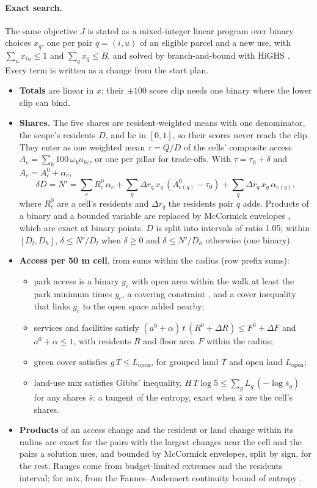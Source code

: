 \documentclass[10pt]{article}
\begin{document}
\paragraph{Exact search.} The same objective $J$ is stated as a mixed-integer linear program over binary choices
$x_q$, one per pair $q = (i, u)$ of an eligible parcel and a new use, with $\sum_u x_{iu} \le 1$ and
$\sum_q x_q \le B$, and solved by branch-and-bound with HiGHS \citep{huangfu2018}. Every term is written as a change
from the start plan.
\begin{itemize}
\item \textbf{Totals} are linear in $x$; their $\pm 100$ score clip needs one binary where the lower clip can bind.
\item \textbf{Shares.} The five shares are resident-weighted means with one denominator, the scope's residents $D$,
and lie in $[0, 1]$, so their scores never reach the clip. They enter as one weighted mean $\tau = Q/D$ of the cells'
composite access $A_c = \sum_k 100\,\omega_k a_{kc}$, or one per pillar for trade-offs. With $\tau = \tau_0 + \delta$
and $A_c = A^0_c + \alpha_c$,
\begin{equation}
\delta D = N' = \sum_c R^0_c\,\alpha_c + \sum_q \Delta r_q\, x_q\,(A^0_{c(q)} - \tau_0) + \sum_q \Delta r_q\, x_q\, \alpha_{c(q)},
\end{equation}
where $R^0_c$ are a cell's residents and $\Delta r_q$ the residents pair $q$ adds. Products of a binary and a
bounded variable are replaced by McCormick envelopes \citep{mccormick1976}, which are exact at binary points. $D$ is
split into intervals of ratio 1.05; within $[D_l, D_h]$, $\delta \le N'/D_l$ when $\delta \ge 0$ and
$\delta \le N'/D_h$ otherwise (one binary).
\item \textbf{Access per 50 m cell}, from sums within the radius (row prefix sums):
\begin{itemize}
\item park access is a binary $y_c$ with open area within the walk at least the park minimum times $y_c$, a covering
constraint \citep{church1974}, and a cover inequality that links $y_c$ to the open space added nearby;
\item services and facilities satisfy $(a^0 + \alpha)\,t\,(R^0 + \Delta R) \le F^0 + \Delta F$ and
$a^0 + \alpha \le 1$, with residents $R$ and floor area $F$ within the radius;
\item green cover satisfies $g\,T \le L_\mathrm{open}$, for grouped land $T$ and open land $L_\mathrm{open}$;
\item land-use mix satisfies Gibbs' inequality, $H\,T\log 5 \le \sum_g L_g\,(-\log \bar s_g)$ for any shares $\bar s$:
a tangent of the entropy, exact when $\bar s$ are the cell's shares.
\end{itemize}
\item \textbf{Products} of an access change and the resident or land change within its radius are exact for the
pairs with the largest changes near the cell and the pairs a solution uses, and bounded by McCormick envelopes, split
by sign, for the rest. Ranges come from budget-limited extremes and the residents interval; for mix, from the
Fannes--Audenaert continuity bound of entropy \citep{audenaert2007}.
\end{itemize}
\end{document}

